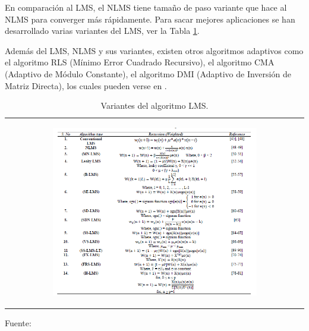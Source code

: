 \begin{enumerate}
\begin{enumerate}
\begin{enumerate}
\begin{equation}
\end{equation}
\vskip 0.5cm
En comparación al LMS, el NLMS tiene tamaño de paso variante que hace al NLMS para converger más rápidamente. Para sacar mejores aplicaciones se han desarrollado varias variantes del LMS, ver la Tabla \ref{table:tabla24}.
\end{enumerate}
\vskip 0.5cm
Además del LMS, NLMS y sus variantes, existen otros algoritmos adaptivos como el algoritmo RLS (Mínimo Error Cuadrado Recursivo), el algoritmo CMA (Adaptivo de Módulo Constante), el algoritmo DMI (Adaptivo de Inversión de Matriz Directa), los cuales pueden verse en \citep{shubhra}.

\begin{center}
\begin{table}[h!]
\centering
\vskip -0.2cm
\caption{\small{Variantes del algoritmo LMS.}}
\label{table:tabla24}
\begin{tabular}{c}
\begin{minipage}{.9\textwidth}
\begin{center}
\includegraphics[width=0.7\textwidth]{Imagenes/Cap2/image019}
\end{center}
\end{minipage}
\end{tabular}
\begin{center}
\vskip 0.2cm
{\small{Fuente: \cite{shubhra}}}
\end{center}
\end{table}
\end{center}


\end{enumerate}
\end{enumerate}
